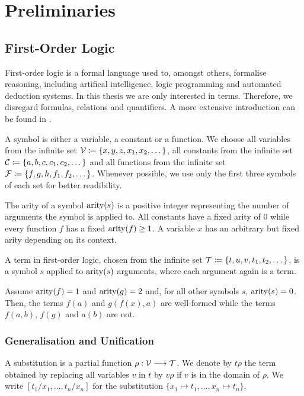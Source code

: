 \chapter{Preliminaries}
\section{First-Order Logic}
First-order logic is a formal language used to, amongst others, formalise reasoning, including artifical intelligence, logic programming and automated deduction systems. In this thesis we are only interested in terms. Therefore, we disregard formulas, relations and quantifiers. A more extensive introduction can be found in \cite{abiteboul_foundations_1995}.

A symbol is either a variable, a constant or a function. We choose all variables from the infinite set $\mathcal{V} \coloneqq \{x, y, z, x_{1}, x_{2}, \dots\}$, all constants from the infinite set $\mathcal{C} \coloneqq \{a, b, c, c_{1}, c_{2}, \dots\}$ and all functions from the infinite set $\mathcal{F} \coloneqq \{f, g, h, f_{1}, f_{2}, \dots\}$. Whenever possible, we use only the first three symbols of each set for better readibility.

The arity of a symbol $\mathrm{arity}(s)$ is a positive integer representing the number of arguments the symbol is applied to. All constants have a fixed arity of $0$ while every function $f$ has a fixed $\mathrm{arity}(f) \geq 1$. A variable $x$ has an arbitrary but fixed arity depending on its context.

A term in first-order logic, chosen from the infinite set $\mathcal{T} \coloneqq \{t, u, v, t_{1}, t_{2}, \dots\}$, is a symbol $s$ applied to $\mathrm{arity}(s)$ arguments, where each argument again is a term.

\begin{exmpl}
Assume $\mathrm{arity}(f) = 1$ and $\mathrm{arity}(g) = 2$ and, for all other symbols $s$, $\mathrm{arity}(s) = 0$. Then, the terms $f(a)$ and $g(f(x), a)$ are well-formed while the terms $f(a,b)$, $f(g)$ and $a(b)$ are not.
\end{exmpl}

\subsection{Generalisation and Unification}
\begin{defn}
  A substitution is a partial function $\rho : \mathcal{V} \longrightarrow \mathcal{T}$. We denote by $t \rho$ the term obtained by replacing all variables $v$ in $t$ by $v \rho$ if $v$ is in the domain of $\rho$. We write $[t_{1}/x_{1},\dots,t_{n}/x_{n}]$ for the substitution $\{x_{1} \mapsto t_{1}, \dots, x_{n} \mapsto t_{n}\}$.
\end{defn}


